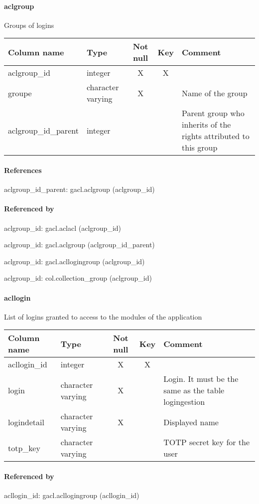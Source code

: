 \paragraph{aclgroup}
Groups of logins

\begin{tabular}{|l| p{2cm}|c|c| p{5cm}|}
\hline
Column name & Type & Not null & Key & Comment \\
\hline
aclgroup\_id & integer & X & X & \\
groupe & character varying & X &  & Name of the group\\
aclgroup\_id\_parent & integer &  &  & Parent group who inherits of the rights attributed to this group\\
\hline
\end{tabular}
\paragraph{References}
aclgroup\_id\_parent: gacl.aclgroup (aclgroup\_id)

\paragraph{Referenced by}
aclgroup\_id: gacl.aclacl (aclgroup\_id)

aclgroup\_id: gacl.aclgroup (aclgroup\_id\_parent)

aclgroup\_id: gacl.acllogingroup (aclgroup\_id)

aclgroup\_id: col.collection\_group (aclgroup\_id)

\paragraph{acllogin}
List of logins granted to access to the modules of the application

\begin{tabular}{|l| p{2cm}|c|c| p{5cm}|}
\hline
Column name & Type & Not null & Key & Comment \\
\hline
acllogin\_id & integer & X & X & \\
login & character varying & X &  & Login. It must be the same as the table logingestion\\
logindetail & character varying & X &  & Displayed name\\
totp\_key & character varying &  &  & TOTP secret key for the user\\
\hline
\end{tabular}
\paragraph{Referenced by}
acllogin\_id: gacl.acllogingroup (acllogin\_id)

